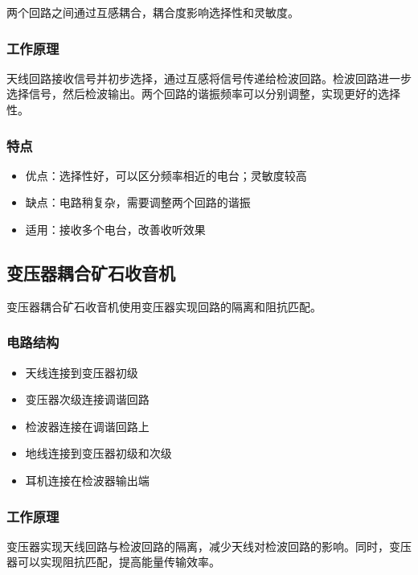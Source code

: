 \documentclass[12pt,UTF8]{ctexbook}
\begin{document}
两个回路之间通过互感耦合，耦合度影响选择性和灵敏度。

\subsubsection{工作原理}

天线回路接收信号并初步选择，通过互感将信号传递给检波回路。检波回路进一步选择信号，然后检波输出。两个回路的谐振频率可以分别调整，实现更好的选择性。

\subsubsection{特点}
\begin{itemize}[leftmargin=3.5em]
    \item 优点：选择性好，可以区分频率相近的电台；灵敏度较高
    \item 缺点：电路稍复杂，需要调整两个回路的谐振
    \item 适用：接收多个电台，改善收听效果
\end{itemize}

\subsection{变压器耦合矿石收音机}

变压器耦合矿石收音机使用变压器实现回路的隔离和阻抗匹配。

\subsubsection{电路结构}

\begin{itemize}[leftmargin=3.5em]
    \item 天线连接到变压器初级
    \item 变压器次级连接调谐回路
    \item 检波器连接在调谐回路上
    \item 地线连接到变压器初级和次级
    \item 耳机连接在检波器输出端
\end{itemize}

\subsubsection{工作原理}

变压器实现天线回路与检波回路的隔离，减少天线对检波回路的影响。同时，变压器可以实现阻抗匹配，提高能量传输效率。
\end{document}
